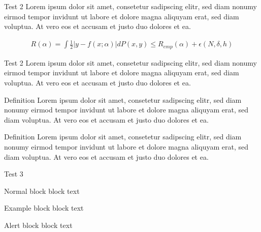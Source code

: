 \documentclass[t]{beamer}
\begin{document}
        \begin{frame}{Test 2}
       	    Lorem ipsum dolor sit amet, consetetur sadipscing elitr, sed diam nonumy eirmod tempor invidunt ut labore et dolore magna aliquyam erat, sed diam voluptua. At vero eos et accusam et justo duo dolores et ea.

            \begin{align}
                R(\alpha) = \int \frac{1}{2} |y - f(x;\alpha)| dP(x,y) \leq R_{emp}(\alpha) + \epsilon(N, \delta, h)
            \end{align}   
        \end{frame}

   
        \begin{frame}{Test 2}
                Lorem ipsum dolor sit amet, consetetur sadipscing elitr, sed diam nonumy eirmod tempor invidunt ut labore et dolore magna aliquyam erat, sed diam voluptua. At vero eos et accusam et justo duo dolores et ea.
            \begin{block}{Definition}
                Lorem ipsum dolor sit amet, consetetur sadipscing elitr, sed diam nonumy eirmod tempor invidunt ut labore et dolore magna aliquyam erat, sed diam voluptua. At vero eos et accusam et justo duo dolores et ea.
            \end{block}
            \pause
            \begin{block}{Definition}
                Lorem ipsum dolor sit amet, consetetur sadipscing elitr, sed diam nonumy eirmod tempor invidunt ut labore et dolore magna aliquyam erat, sed diam voluptua. At vero eos et accusam et justo duo dolores et ea.
            \end{block}
        \end{frame}

        \begin{frame}{Test 3}
            \begin{block}{Normal block}
            block text
            \end{block}
            
            \begin{exampleblock}{Example block}
            block text
            \end{exampleblock}
            
            
            \begin{alertblock}{Alert block}
            block text
            \end{alertblock}
        \end{frame}
\end{document}
